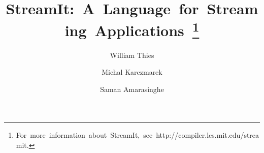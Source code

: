 \documentclass[runningheads]{llncs}
\begin{document}
\pagestyle{headings}

\mainmatter

\title{\mbox{StreamIt:  A Language for Streaming Applications
\thanks{\mbox{For more information about StreamIt, see http://compiler.lcs.mit.edu/streamit.}}}}


\author{William Thies 
	\and Michal Karczmarek 
\and Saman Amarasinghe}



\maketitle

\begin{abstract}

\end{abstract}




%







%
\end{document}
